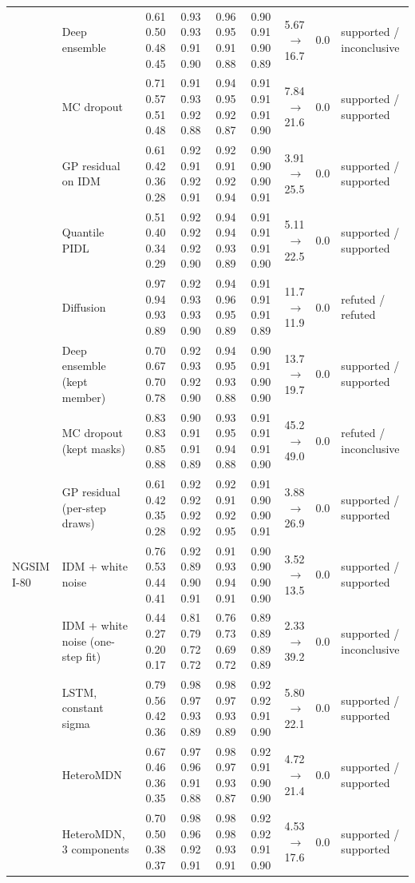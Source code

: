 \begin{longtable}{llrrrrrrl}
 & Deep ensemble & 0.61 0.50 0.48 0.45 & 0.93 0.93 0.91 0.90 & 0.96 0.95 0.91 0.88 & 0.90 0.91 0.90 0.89 & 5.67 $\rightarrow$ 16.7 & 0.0 & supported / inconclusive \\
 & MC dropout & 0.71 0.57 0.51 0.48 & 0.91 0.93 0.92 0.88 & 0.94 0.95 0.92 0.87 & 0.91 0.91 0.91 0.90 & 7.84 $\rightarrow$ 21.6 & 0.0 & supported / supported \\
 & GP residual on IDM & 0.61 0.42 0.36 0.28 & 0.92 0.91 0.92 0.91 & 0.92 0.91 0.92 0.94 & 0.90 0.90 0.90 0.91 & 3.91 $\rightarrow$ 25.5 & 0.0 & supported / supported \\
 & Quantile PIDL & 0.51 0.40 0.34 0.29 & 0.92 0.92 0.92 0.90 & 0.94 0.94 0.93 0.89 & 0.91 0.91 0.91 0.90 & 5.11 $\rightarrow$ 22.5 & 0.0 & supported / supported \\
 & Diffusion & 0.97 0.94 0.93 0.89 & 0.92 0.93 0.93 0.90 & 0.94 0.96 0.95 0.89 & 0.91 0.91 0.91 0.89 & 11.7 $\rightarrow$ 11.9 & 0.0 & refuted / refuted \\
 & Deep ensemble (kept member) & 0.70 0.67 0.70 0.78 & 0.92 0.93 0.92 0.90 & 0.94 0.95 0.93 0.88 & 0.90 0.91 0.90 0.90 & 13.7 $\rightarrow$ 19.7 & 0.0 & supported / supported \\
 & MC dropout (kept masks) & 0.83 0.83 0.85 0.88 & 0.90 0.91 0.91 0.89 & 0.93 0.95 0.94 0.88 & 0.91 0.91 0.91 0.90 & 45.2 $\rightarrow$ 49.0 & 0.0 & refuted / inconclusive \\
 & GP residual (per-step draws) & 0.61 0.42 0.35 0.28 & 0.92 0.92 0.92 0.92 & 0.92 0.91 0.92 0.95 & 0.91 0.90 0.90 0.91 & 3.88 $\rightarrow$ 26.9 & 0.0 & supported / supported \\
\midrule
NGSIM I-80 & IDM + white noise & 0.76 0.53 0.44 0.41 & 0.92 0.89 0.90 0.91 & 0.91 0.93 0.94 0.91 & 0.90 0.90 0.90 0.90 & 3.52 $\rightarrow$ 13.5 & 0.0 & supported / supported \\
 & IDM + white noise (one-step fit) & 0.44 0.27 0.20 0.17 & 0.81 0.79 0.72 0.72 & 0.76 0.73 0.69 0.72 & 0.89 0.89 0.89 0.89 & 2.33 $\rightarrow$ 39.2 & 0.0 & supported / inconclusive \\
 & LSTM, constant sigma & 0.79 0.56 0.42 0.36 & 0.98 0.97 0.93 0.89 & 0.98 0.97 0.93 0.89 & 0.92 0.92 0.91 0.90 & 5.80 $\rightarrow$ 22.1 & 0.0 & supported / supported \\
 & HeteroMDN & 0.67 0.46 0.36 0.35 & 0.97 0.96 0.91 0.88 & 0.98 0.97 0.93 0.87 & 0.92 0.91 0.90 0.90 & 4.72 $\rightarrow$ 21.4 & 0.0 & supported / supported \\
 & HeteroMDN, 3 components & 0.70 0.50 0.38 0.37 & 0.98 0.96 0.92 0.91 & 0.98 0.98 0.93 0.91 & 0.92 0.92 0.91 0.90 & 4.53 $\rightarrow$ 17.6 & 0.0 & supported / supported \\

\end{longtable}
